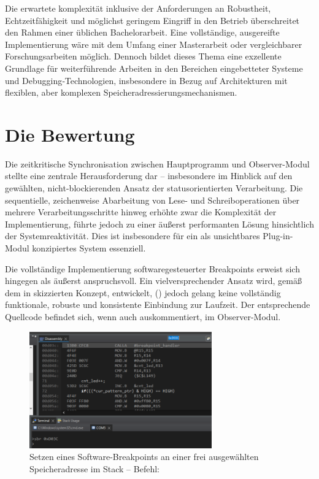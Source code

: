 Die erwartete komplexit\"at inklusive der Anforderungen an Robustheit, Echtzeitf\"ahigkeit und m\"oglichst geringem Eingriff in den Betrieb \"uberschreitet den Rahmen einer \"ublichen Bachelorarbeit. Eine vollst\"andige, ausgereifte Implementierung w\"are mit dem Umfang einer Masterarbeit oder vergleichbarer Forschungsarbeiten m\"oglich. Dennoch bildet dieses Thema eine exzellente Grundlage f\"ur weiterf\"uhrende Arbeiten in den Bereichen eingebetteter Systeme und Debugging‑Technologien, insbesondere in Bezug auf Architekturen mit flexiblen, aber komplexen Speicheradressierungsmechanismen.


\newpage
\section{Die Bewertung}
\label{sec:Bewertung}
Die zeitkritische Synchronisation zwischen Hauptprogramm und Observer-Modul stellte eine zentrale Herausforderung dar -- insbesondere im Hinblick auf den gew\"ahlten, nicht-blockierenden Ansatz der statusorientierten Verarbeitung. Die sequentielle, zeichenweise Abarbeitung von Lese- und Schreiboperationen \"uber mehrere Verarbeitungsschritte hinweg erh\"ohte zwar die Komplexit\"at der Implementierung, f\"uhrte jedoch zu einer \"au{\ss}erst performanten L\"osung hinsichtlich der Systemreaktivit\"at. Dies ist insbesondere f\"ur ein als \glqq{}unsichtbares\grqq{} Plug-in-Modul konzipiertes System essenziell.

Die vollst\"andige Implementierung softwaregesteuerter Breakpoints erweist sich hingegen als \"au{\ss}erst anspruchsvoll. Ein vielversprechender Ansatz wird, gem\"a{\ss} dem in  skizzierten Konzept, entwickelt, () jedoch gelang keine vollst\"andig funktionale, robuste und konsistente Einbindung zur Laufzeit. Der entsprechende Quellcode befindet sich, wenn auch auskommentiert, im Observer-Modul.

\begin{figure}[h!]
	\centering
	\includegraphics[width=0.7\textwidth]{../Bilder/ObserverModule/set_breakpoint.png}
	\caption{Setzen eines Software-Breakpoints an einer frei ausgew\"ahlten Speicheradresse im Stack -- Befehl: }
	\label{fig:software_breakpoint}
\end{figure}


